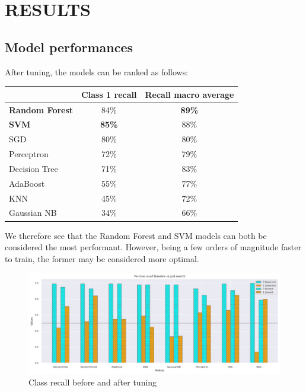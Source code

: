 \section{RESULTS}
\begin{frame}{\secname}
\end{frame}

\subsection{Model performances}
\begin{frame}{\subsecname}
After tuning, the models can be ranked as follows:

\begin{table}
    \centering
    \begin{tabular}{l|cc}
         & Class 1 recall & Recall macro average \\
         \hline\hline
         \textbf{Random Forest} & 84\% & \textbf{89\%} \\
         \textbf{SVM} & \textbf{85\%} & 88\% \\
         SGD & 80\% & 80\% \\
         Perceptron & 72\% & 79\% \\
         Decision Tree & 71\% & 83\% \\
         AdaBoost & 55\% & 77\% \\
         KNN & 45\% & 72\% \\
         Gaussian NB & 34\% & 66\% \\
    \end{tabular}
    \label{tab:my_label}
\end{table}

We therefore see that the Random Forest and SVM models can both be considered the most performant. However, being a few orders of magnitude faster to train, the former may be considered more optimal.

\end{frame}

\begin{frame}{\subsecname}
\begin{figure}
    \centering
    \includegraphics[width=1\linewidth]{images/recalls_before_after.png}
    \caption{Class recall before and after tuning}
    \label{fig:recall_before_after}
\end{figure}
\end{frame}

